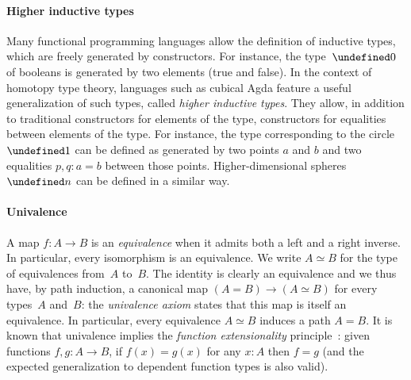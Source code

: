 \documentclass[10pt,a4paper]{amsart}
\theoremstyle{definition}
\let\S\undefined
\newcommand{\S}[1]{\operatorname{S}^{#1}} %
\newcommand{\equivto}{\simeq} %
\begin{document}
\paragraph{Higher inductive types}
Many functional programming languages allow the definition of inductive types,
which are freely generated by constructors. For instance, the type~$\S0$ of
booleans is generated by two elements (true and false).
%
In the context of homotopy type theory, languages such as cubical Agda feature a
useful generalization of such types, called \emph{higher inductive types}. They allow, in addition to traditional constructors for elements of the type,
constructors for equalities between elements of the type. For instance, the type
corresponding to the circle $\S1$ can be defined as generated by two points $a$
and $b$ and two equalities $p,q:a=b$ between those points.
Higher-dimensional spheres~$\S n$ can be defined in a similar way.

\paragraph{Univalence}
\label{equivalence}
A map $f:A\to B$ is an \emph{equivalence} when it admits both a left and a right
inverse. In particular, every isomorphism is an equivalence. We write
$A\equivto B$ for the type of equivalences from~$A$ to~$B$. The identity is
clearly an equivalence and we thus have, by path induction, a canonical map
$(A=B)\to(A\equivto B)$ for every types~$A$ and~$B$: the \emph{univalence axiom}
states that this map is itself an equivalence.
%
In particular, every equivalence $A\equivto B$ induces a path $A=B$.
%
It is known that univalence implies the \emph{function extensionality}
principle~\cite[Section~2.9]{hottbook}: given functions $f,g:A\to B$, if
$f(x)=g(x)$ for any $x:A$ then $f=g$ (and the expected generalization to
dependent function types is also valid).
\end{document}
